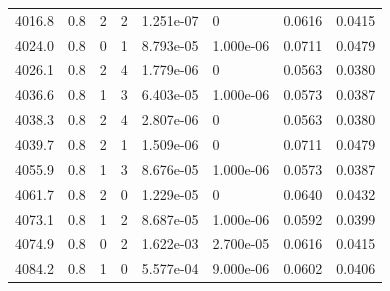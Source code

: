 \documentclass[preview]{standalone}
\begin{document}
{{{{{{{{{{{\begin{tabular}{L{1.2cm}C{1.2cm} C{0.3cm}C{0.5cm} C{1.4cm}C{1.4cm} C{1.4cm}C{1.4cm}}
  4016.8  &   0.8  & 2     &  2 &  1.251e-07  & 0  & 0.0616 &  0.0415   \\ 
  4024.0  &   0.8  & 0     &  1 &  8.793e-05  & 1.000e-06  & 0.0711 &  0.0479   \\ 
  4026.1  &   0.8  & 2     &  4 &  1.779e-06  & 0  & 0.0563 &  0.0380   \\ 
  4036.6  &   0.8  & 1     &  3 &  6.403e-05  & 1.000e-06  & 0.0573 &  0.0387   \\ 
  4038.3  &   0.8  & 2     &  4 &  2.807e-06  & 0  & 0.0563 &  0.0380   \\ 
  4039.7  &   0.8  & 2     &  1 &  1.509e-06  & 0  & 0.0711 &  0.0479   \\ 
  4055.9  &   0.8  & 1     &  3 &  8.676e-05  & 1.000e-06  & 0.0573 &  0.0387   \\ 
  4061.7  &   0.8  & 2     &  0 &  1.229e-05  & 0  & 0.0640 &  0.0432   \\ 
  4073.1  &   0.8  & 1     &  2 &  8.687e-05  & 1.000e-06  & 0.0592 &  0.0399   \\ 
  4074.9  &   0.8  & 0     &  2 &  1.622e-03  & 2.700e-05  & 0.0616 &  0.0415   \\ 
  4084.2  &   0.8  & 1     &  0 &  5.577e-04  & 9.000e-06  & 0.0602 &  0.0406   \\ 
\hline 
\end{tabular} 

}}}}}}}}}}}
\end{document}
